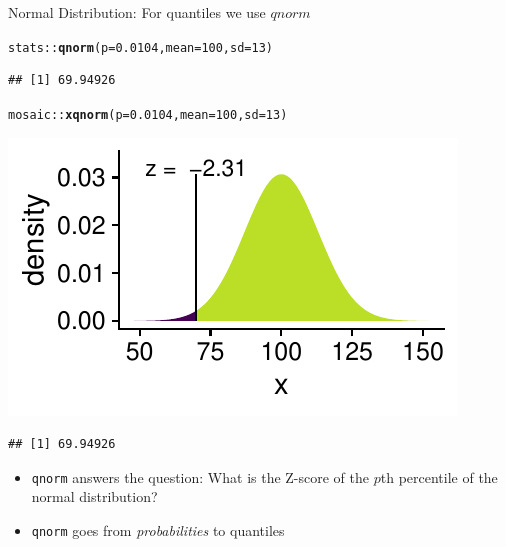 \documentclass[10pt,handout]{beamer}\usepackage[]{graphicx}\usepackage[]{color}
\makeatletter
\newcommand{\hlnum}[1]{\textcolor[rgb]{0.686,0.059,0.569}{#1}}%
\newcommand{\hlopt}[1]{\textcolor[rgb]{0,0,0}{#1}}%
\newcommand{\hlstd}[1]{\textcolor[rgb]{0.345,0.345,0.345}{#1}}%
\newcommand{\hlkwc}[1]{\textcolor[rgb]{0.333,0.667,0.333}{#1}}%
\newcommand{\hlkwd}[1]{\textcolor[rgb]{0.737,0.353,0.396}{\textbf{#1}}}%
\newenvironment{kframe}{%
 \def\at@end@of@kframe{}%
 \ifinner\ifhmode%
  \def\at@end@of@kframe{\end{minipage}}%
  \begin{minipage}{\columnwidth}%
 \fi\fi%
 \def\FrameCommand##1{\hskip\@totalleftmargin \hskip-\fboxsep
 \colorbox{shadecolor}{##1}\hskip-\fboxsep
     \hskip-\linewidth \hskip-\@totalleftmargin \hskip\columnwidth}%
 \MakeFramed {\advance\hsize-\width
   \@totalleftmargin\z@ \linewidth\hsize
   \@setminipage}}%
 {\par\unskip\endMakeFramed%
 \at@end@of@kframe}
\newenvironment{knitrout}{}{} %
\makeatother
\begin{document}
\begin{frame}[fragile]{Normal Distribution: For quantiles we use $qnorm$}
	
	
	
\begin{knitrout}\tiny
{}\color{fgcolor}\begin{kframe}
\begin{alltt}
\hlstd{stats}\hlopt{::}\hlkwd{qnorm}\hlstd{(}\hlkwc{p} \hlstd{=} \hlnum{0.0104}\hlstd{,} \hlkwc{mean} \hlstd{=} \hlnum{100}\hlstd{,} \hlkwc{sd} \hlstd{=} \hlnum{13}\hlstd{)}
\end{alltt}
\begin{verbatim}
## [1] 69.94926
\end{verbatim}
\end{kframe}
\end{knitrout}
	
	
	
\begin{knitrout}\tiny
{}\color{fgcolor}\begin{kframe}
\begin{alltt}
\hlstd{mosaic}\hlopt{::}\hlkwd{xqnorm}\hlstd{(}\hlkwc{p} \hlstd{=} \hlnum{0.0104}\hlstd{,} \hlkwc{mean} \hlstd{=} \hlnum{100}\hlstd{,} \hlkwc{sd} \hlstd{=} \hlnum{13}\hlstd{)}
\end{alltt}
\end{kframe}

{\centering \includegraphics[width=0.6\linewidth]{figure/probs5-1} 

}


\begin{kframe}\begin{verbatim}
## [1] 69.94926
\end{verbatim}
\end{kframe}
\end{knitrout}
	
	
	
	\small{
		\begin{itemize}
			\item \texttt{qnorm} answers the question: What is the Z-score of the $p$th percentile of the normal distribution?
			
			\item \texttt{qnorm} goes from \textit{probabilities} to quantiles 
		\end{itemize}
	}
\end{frame}
\end{document}
